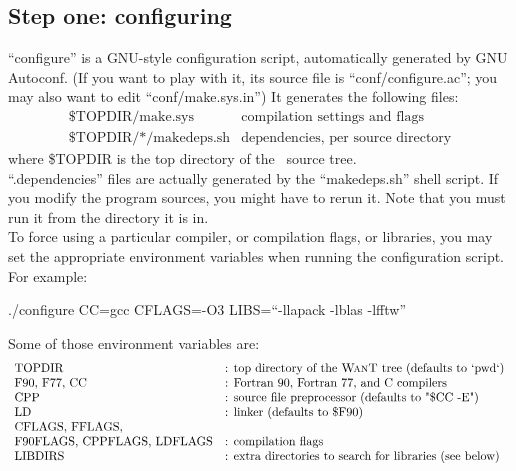 \subsection{Step one: configuring} ``configure'' is a GNU-style configuration script,
automatically generated by GNU Autoconf.  (If you want to play
with it, its source file is ``conf/configure.ac''; you may also
want to edit ``conf/make.sys.in'')  It generates the following
files:
\begin{displaymath}
\begin{array}{ll}
  \textrm{\$TOPDIR/make.sys}        &      \textrm{compilation settings and flags}\\
  \textrm{\$TOPDIR/*/makedeps.sh}   &      \textrm{dependencies, per
  source directory}
\end{array}
\end{displaymath}
\noindent where \$TOPDIR is the top directory of the \WANT\ source
tree.\\

\noindent ``.dependencies'' files are actually generated by the
``makedeps.sh'' shell script.  If you modify the program sources,
you might have to rerun it.  Note that you must run it from the
directory it is in.\\

\noindent To force using a particular compiler, or compilation
flags, or libraries, you may set the appropriate environment
variables when running the configuration script.  For example:

\begin{description}
  \item ./configure CC=gcc CFLAGS=-O3 LIBS=``-llapack -lblas
  -lfftw''
\end{description}

\noindent Some of those environment variables are:
\begin{displaymath}
\begin{array}{ll}
  \textrm{TOPDIR}       &\textrm{: top directory of the {\sc WanT}\ tree (defaults to `pwd`)}\\
  \textrm{F90, F77, CC} &\textrm{: Fortran 90, Fortran 77, and C compilers}\\
  \textrm{CPP}          &\textrm{: source file preprocessor (defaults to "\$CC -E")}\\
  \textrm{LD}           &\textrm{: linker (defaults to \$F90)}\\
  \textrm{CFLAGS, FFLAGS,}  &\textrm{ }\\
  \textrm{F90FLAGS, CPPFLAGS, LDFLAGS} &\textrm{: compilation flags}\\
  \textrm{LIBDIRS}      &\textrm{: extra directories to search for libraries (see below)}\\
\end{array}
\end{displaymath}

